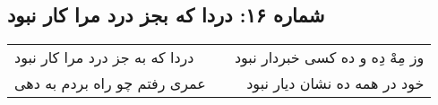 \begin{center}
\section*{شماره ۱۶: دردا که بجز درد مرا کار نبود}
\label{sec:016}
\begin{longtable}{l p{0.5cm} r}
دردا که به جز درد مرا کار نبود
&&
وز مِهْ دِه و ده کسی خبردار نبود
\\
عمری رفتم چو راه بردم به دهی
&&
خود در همه ده نشان دیار نبود
\\
\end{longtable}
\end{center}
